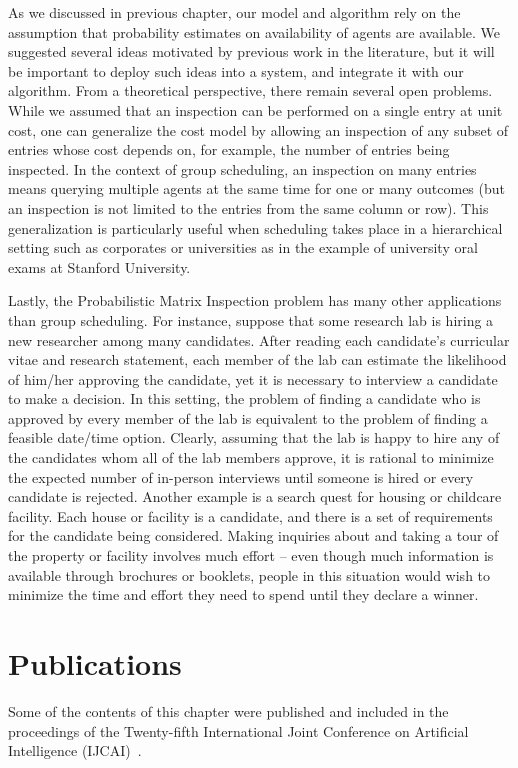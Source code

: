 As we discussed in previous chapter, our model and algorithm rely on the assumption that probability estimates on availability of agents are available. We suggested several ideas motivated by previous work in the literature, but it will be important to deploy such ideas into a system, and integrate it with our algorithm. From a theoretical perspective, there remain several open problems. While we assumed that an inspection can be performed on a single entry at unit cost, one can generalize the cost model by allowing an inspection of any subset of entries whose cost depends on, for example, the number of entries being inspected. In the context of group scheduling, an inspection on many entries means querying multiple agents at the same time for one or many outcomes (but an inspection is not limited to the entries from the same column or row). This generalization is particularly useful when scheduling takes place in a hierarchical setting such as corporates or universities as in the example of  university oral exams at Stanford University.

Lastly, the Probabilistic Matrix Inspection problem has many other applications than group scheduling. 
For instance, suppose that some research lab is hiring a new researcher among many candidates.
After reading each candidate's curricular vitae and research statement,
each member of the lab can estimate the likelihood of him/her approving the candidate, yet it is necessary to interview a candidate to make a decision.
In this setting, the problem of finding a candidate who is approved by every member of the lab is equivalent to the problem of finding a feasible date/time option. Clearly, assuming that the lab is happy to hire any of the candidates whom all of the lab members approve, it is rational to minimize the expected number of in-person interviews until someone is hired or every candidate is rejected.
Another example is a search quest for housing or childcare facility.
Each house or facility is a candidate, and there is a set of requirements for the candidate being considered. Making inquiries about and taking a tour of the property or facility involves much effort -- even though much information is available through brochures or booklets, people in this situation would wish to minimize the time and effort they need to spend until they declare a winner.


\section*{Publications}
Some of the contents of this chapter were published and included in the proceedings of the Twenty-fifth International Joint Conference on Artificial Intelligence (IJCAI)~\cite{lee2016pmip}.
